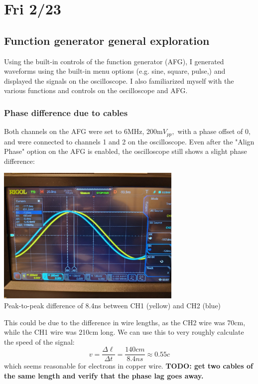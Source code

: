 \documentclass{article}
\begin{document}
    \section*{Fri 2/23}
    \subsection*{Function generator general exploration}
    Using the built-in controls of the function generator (AFG), I generated waveforms using the built-in menu options (e.g. sine, square, pulse,) and displayed the signals on the oscilloscope. I also familiarized myself with the various functions and controls on the oscilloscope and AFG.
    \subsubsection*{Phase difference due to cables}
    Both channels on the AFG were set to 6MHz, 200m$V_{pp},$ with a phase offset of $0,$ and were connected to channels 1 and 2 on the oscilloscope. Even after the "Align Phase" option on the AFG is enabled, the oscilloscope still shows a slight phase difference: 
    \begin{mdframed}[backgroundcolor=gray!20, align = center, userdefinedwidth = 3.8in]
    \includegraphics[width = 3.5in]{img/phase_difference.jpg}
    \\Peak-to-peak difference of 8.4ns between CH1 (yellow) and CH2 (blue)
    \end{mdframed}
    This could be due to the difference in wire lengths, as the CH2 wire was 70cm, while the CH1 wire was 210cm long. We can use this to very roughly calculate the speed of the signal:
    $$v = \frac{\Delta \ell}{\Delta t} = \frac{140cm}{8.4ns} \approx 0.55c$$
    which seems reasonable for electrons in copper wire. \textbf{TODO: get two cables of the same length and verify that the phase lag goes away.}
\end{document}
